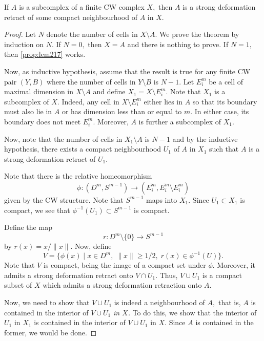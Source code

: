 \documentclass[12pt]{article}
\begin{document}
\begin{thm} \label{thm:subcomplexdefret}
	If $A$ is a subcomplex of a finite CW complex $X,$ then $A$ is a strong deformation retract of some compact neighbourhood of $A$ in $X.$
\end{thm}
\begin{proof} 
	Let $N$ denote the number of cells in $X \setminus A.$ We prove the theorem by induction on $N.$ If $N = 0,$ then $X = A$ and there is nothing to prove. If $N = 1,$ then \cref{prop:lem217} works.

	Now, as inductive hypothesis, assume that the result is true for any finite CW pair $(Y, B)$ where the number of cells in $Y\setminus B$ is $N - 1.$ Let $E_i^m$ be a cell of maximal dimension in $X \setminus A$ and define $X_1 = X \setminus E_i^m.$ Note that $X_1$ is a subcomplex of $X.$ Indeed, any cell in $X \setminus E_i^m$ either lies in $A$ so that its boundary must also lie in $A$ or has dimension less than or equal to $m.$ In either case, its boundary does not meet $E_i^m.$ Moreover, $A$ is further a subcomplex of $X_1.$

	Now, note that the number of cells in $X_1 \setminus A$ is $N - 1$ and by the inductive hypothesis, there exists a compact neighbourhood $U_1$ of $A$ in $X_1$ such that $A$ is a strong deformation retract of $U_1.$

	Note that there is the relative homeomorphism
	\begin{equation*} 
		\phi:(D^m, S^{m-1}) \to (\overline{E_i^m}, \overline{E_i^m} \setminus E_{i}^m)
	\end{equation*}
	given by the CW structure. Note that $S^{m-1}$ maps into $X_1.$ Since $U_1 \subset X_1$ is compact, we see that $\phi^{-1}(U_1) \subset S^{m-1}$ is compact.

	Define the map
	\begin{equation*} 
		r:D^m\setminus\{0\} \to S^{m-1}
	\end{equation*}
	by $r(x) = x/\|x\|.$ Now, define
	\begin{equation*} 
		V = \{\phi(x) \mid x \in D^m,\; \|x\| \ge 1/2,\; r(x) \in \phi^{-1}(U)\}.
	\end{equation*}
	Note that $V$ is compact, being the image of a compact set under $\phi.$ Moreover, it admits a strong deformation retract onto $V \cap U_1.$ Thus, $V \cup U_1$ is a compact subset of $X$ which admits a strong deformation retraction onto $A.$

	Now, we need to show that $V \cup U_1$ is indeed a neighbourhood of $A,$ that is, $A$ is contained in the interior of $V \cup U_1$ \emph{in $X$.} To do this, we show that the interior of $U_1$ in $X_1$ is contained in the interior of $V \cup U_1$ in $X.$ Since $A$ is contained in the former, we would be done.


\end{proof}
\end{document}
